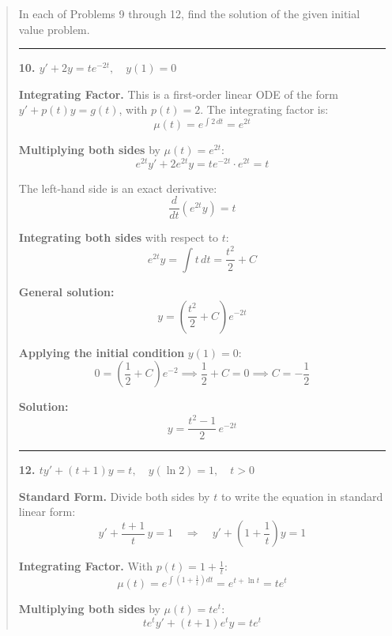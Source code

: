 \begin{quote}
\begin{respuesta}
\end{respuesta}




\noindent In each of Problems 9 through 12, find the solution of the given initial value problem.
\begin{center}
    \rule{0.5\textwidth}{0.5pt}
\end{center}


\textbf{10.  $y' + 2y = te^{-2t}, \quad y(1) = 0$}
\begin{respuesta}

\textbf{Integrating Factor.} This is a first-order linear ODE of the form
$y' + p(t)y = g(t)$, with $p(t) = 2$. The integrating factor is:
\[
\mu(t) = e^{\int 2\, dt} = e^{2t}
\]

\textbf{Multiplying both sides} by $\mu(t) = e^{2t}$:
\[
e^{2t}y' + 2e^{2t}y = te^{-2t} \cdot e^{2t} = t
\]

The left-hand side is an exact derivative:
\[
\frac{d}{dt}\!\left(e^{2t}y\right) = t
\]

\textbf{Integrating both sides} with respect to $t$:
\[
e^{2t}y = \int t\, dt = \frac{t^2}{2} + C
\]

\textbf{General solution:}
\[
y = \left(\frac{t^2}{2} + C\right)e^{-2t}
\]

\textbf{Applying the initial condition} $y(1) = 0$:
\[
0 = \left(\frac{1}{2} + C\right)e^{-2} \implies \frac{1}{2} + C = 0 \implies C = -\frac{1}{2}
\]

\textbf{Solution:}
\[
\boxed{y = \frac{t^2 - 1}{2}\,e^{-2t}}
\]

\end{respuesta}



\begin{center}
    \rule{0.5\textwidth}{0.5pt}
\end{center}


\textbf{12. $ty' + (t + 1)y = t, \quad y(\ln 2) = 1, \quad t > 0$}
\begin{respuesta}

\textbf{Standard Form.} Divide both sides by $t$ to write the equation in standard linear form:
\[
y' + \frac{t+1}{t}\,y = 1 \quad \Longrightarrow \quad y' + \left(1 + \frac{1}{t}\right)y = 1
\]

\textbf{Integrating Factor.} With $p(t) = 1 + \tfrac{1}{t}$:
\[
\mu(t) = e^{\int\!\left(1 + \frac{1}{t}\right)dt} = e^{t + \ln t} = te^{t}
\]

\textbf{Multiplying both sides} by $\mu(t) = te^{t}$:
\[
te^{t}y' + (t+1)e^{t}y = te^{t}
\]


\end{respuesta}
\end{quote}
